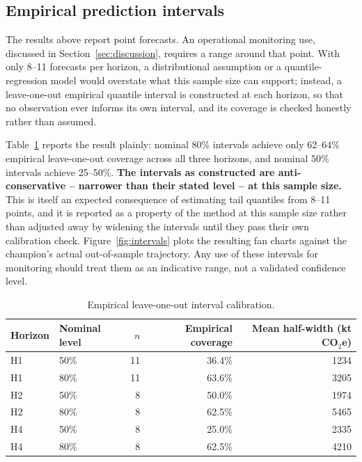 \documentclass[preprint,12pt]{elsarticle}
\begin{document}
\subsection{Empirical prediction intervals}\label{sec:intervals}

The results above report point forecasts. An operational monitoring use, discussed in Section~\ref{sec:discussion}, requires a range around that point. With only 8--11 forecasts per horizon, a distributional assumption or a quantile-regression model would overstate what this sample size can support; instead, a leave-one-out empirical quantile interval is constructed at each horizon, so that no observation ever informs its own interval, and its coverage is checked honestly rather than assumed.

Table~\ref{tab:intervals} reports the result plainly: nominal 80\% intervals achieve only 62--64\% empirical leave-one-out coverage across all three horizons, and nominal 50\% intervals achieve 25--50\%. \textbf{The intervals as constructed are anti-conservative -- narrower than their stated level -- at this sample size.} This is itself an expected consequence of estimating tail quantiles from 8--11 points, and it is reported as a property of the method at this sample size rather than adjusted away by widening the intervals until they pass their own calibration check. Figure~\ref{fig:intervals} plots the resulting fan charts against the champion's actual out-of-sample trajectory. Any use of these intervals for monitoring should treat them as an indicative range, not a validated confidence level.

\begin{table}[!htbp]
\centering
\caption{Empirical leave-one-out interval calibration.}
\label{tab:intervals}
\begin{tabular}{@{}llrrr@{}}
\toprule
Horizon & Nominal level & $n$ & Empirical coverage & Mean half-width (kt CO$_2$e) \\
\midrule
H1 & 50\% & 11 & 36.4\% & 1234 \\
H1 & 80\% & 11 & 63.6\% & 3205 \\
H2 & 50\% & 8 & 50.0\% & 1974 \\
H2 & 80\% & 8 & 62.5\% & 5465 \\
H4 & 50\% & 8 & 25.0\% & 2335 \\
H4 & 80\% & 8 & 62.5\% & 4210 \\
\bottomrule
\end{tabular}
\end{table}
\end{document}
